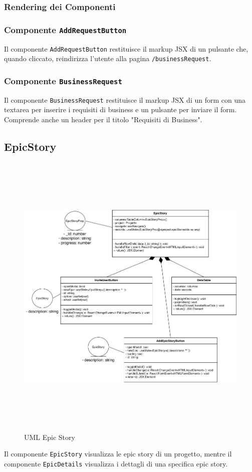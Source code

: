 \documentclass{article}
\begin{document}
\subsubsection*{Rendering dei Componenti}

\subsubsection*{Componente \texttt{AddRequestButton}}

Il componente \texttt{AddRequestButton} restituisce il markup JSX di un pulsante che, quando cliccato, reindirizza l'utente alla pagina \texttt{/businessRequest}.

\subsubsection*{Componente \texttt{BusinessRequest}}

Il componente \texttt{BusinessRequest} restituisce il markup JSX di un form con una textarea per inserire i requisiti di business e un pulsante per inviare il form. Comprende anche un header per il titolo "Requisiti di Business".


\subsection{EpicStory}
\begin{figure}[H]
    \centering
    \includegraphics[width=1\textwidth, height=400pt]{documenti/imgUMLFrontend/Epic.jpg}
    \caption{UML Epic Story}
    \label{fig:uml-epicStory}
\end{figure}
Il componente \texttt{EpicStory} visualizza le epic story di un progetto, mentre il componente \texttt{EpicDetails} visualizza i dettagli di una specifica epic story.
\end{document}
